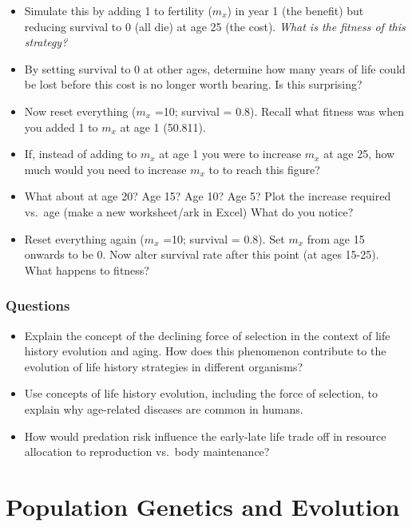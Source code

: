 \documentclass[
  a4paper]{book}
\providecommand{\tightlist}{%
  \setlength{\itemsep}{0pt}\setlength{\parskip}{0pt}}
\begin{document}
\begin{itemize}
\item
  Simulate this by adding 1 to fertility (\(m_x\)) in year 1 (the benefit) but reducing survival to 0 (all die) at age 25 (the cost). \emph{What is the fitness of this strategy?}
\item
  By setting survival to 0 at other ages, determine how many years of life could be lost before this cost is no longer worth bearing. Is this surprising?
\item
  Now reset everything (\(m_x\) =10; survival = 0.8). Recall what fitness was when you added 1 to \(m_x\) at age 1 (50.811).
\item
  If, instead of adding to \(m_x\) at age 1 you were to increase \(m_x\) at age 25, how much would you need to increase \(m_x\) to to reach this figure?
\item
  What about at age 20? Age 15? Age 10? Age 5?
  Plot the increase required vs.~age (make a new worksheet/ark in Excel) What do you notice?
\item
  Reset everything again (\(m_x\) =10; survival = 0.8). Set \(m_x\) from age 15 onwards to be 0. Now alter survival rate after this point (at ages 15-25). What happens to fitness?
\end{itemize}

\section{Questions}\label{questions-10}

\begin{itemize}
\tightlist
\item
  Explain the concept of the declining force of selection in the context of life history evolution and aging. How does this phenomenon contribute to the evolution of life history strategies in different organisms?
\item
  Use concepts of life history evolution, including the force of selection, to explain why age-related diseases are common in humans.
\item
  How would predation risk influence the early-late life trade off in resource allocation to reproduction vs.~body maintenance?
\end{itemize}

\part{Population Genetics and Evolution}\label{part-population-genetics-and-evolution}
\end{document}

